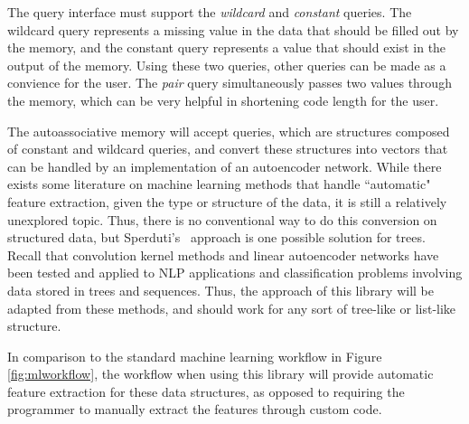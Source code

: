 \documentclass{sig-alternate}
\begin{document}
The query interface must support the \textit{wildcard} and \textit{constant} queries. The wildcard
query represents a missing value in the data that should be filled out by the memory, and the constant
query represents a value that should exist in the output of the memory. Using these two queries,
other queries can be made as a convience for the user. The \textit{pair} query simultaneously
passes two values through the memory, which can be very helpful in shortening code length for the user.

The autoassociative memory will accept queries, which are structures composed of constant and wildcard queries,
and convert these structures into vectors that can be handled by an implementation of an autoencoder
network. While there exists some literature on machine learning methods that handle ``automatic" feature 
extraction, given the type or structure of the data, it is still a relatively unexplored topic. Thus, there is no conventional way to do this conversion on structured data, but
Sperduti's~\cite{sperduti} approach is one possible solution for trees.
Recall that convolution kernel methods and 
linear autoencoder networks have been tested and applied to NLP applications and classification problems involving data 
stored in trees and sequences. Thus, the approach of this library will be adapted from these methods, and should work for any sort 
of tree-like or list-like structure.



In comparison to the standard machine learning workflow in Figure \ref{fig:mlworkflow}, the workflow
when using this library will provide automatic feature extraction for these data structures, as opposed to
requiring the programmer to manually extract the features through custom code.

\end{document}

